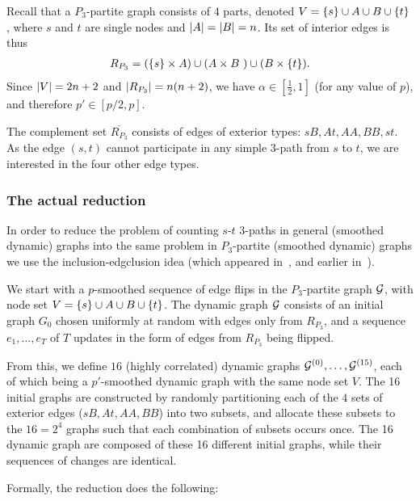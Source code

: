\documentclass[letter,11pt]{article}
\newcommand{\st}{$s$-$t$\xspace}
\begin{document}
Recall that a $P_3$-partite graph consists of $4$ parts, denoted $V = \{s\} \cup A \cup B \cup \{t\}$, where $s$ and $t$ are single nodes and $\card{A} = \card{B} = n$.
Its set of interior edges is thus
\[
\begin{aligned}
    R_{P_3} = \left(\set{s}\times A\right) \cup \left(A\times B\
\right) \cup \left(B\times \set{t}\right) .
\end{aligned}
\]
Since 
$\card{V}=2n+2$ and 
$\card{R_{P_3}} = n(n+2)$,
we have $\alpha\in[\frac{1}{2}, 1]$ (for any value of $p$), and therefore $p' \in [p/2,p]$.

The complement set $\overline{R_{P_3}}$ consists of edges of exterior types: $sB, At, AA, BB, st$. 
As the edge $(s,t)$ cannot participate in any simple $3$-path from $s$ to $t$, we are interested in the four other edge types.

\subsubsection{The actual reduction}
In order to reduce the problem of counting \st 3-paths in general (smoothed dynamic) graphs into the same problem in $P_3$-partite (smoothed dynamic) graphs
we use the inclusion-edgclusion idea (which appeared in~\cite{HLS22}, and earlier in~\cite{DalirrooyfardLW20,Boix-AdseraBB19}).


We start with a $p$-smoothed sequence of edge flips in the $P_3$-partite graph $\mathcal{G}$,
with node set
$V = \{s\} \cup A \cup B \cup \{t\}$.
The dynamic graph $\mathcal{G}$ consists of an initial graph $G_0$ chosen uniformly at random with edges only from $R_{P_3}$, and a sequence $e_1, \dots, e_T$ of $T$ updates in the form of edges from $R_{P_3}$ being flipped.

From this, we define $16$ (highly correlated) dynamic graphs $\mathcal{G}^{(0)}, \dots, \mathcal{G}^{(15)}$, each of which being a $p'$-smoothed dynamic graph with the same node set $V$.
The 16 initial graphs are constructed by randomly partitioning each of the $4$ sets of exterior edges ($sB, At, AA, BB$) into two subsets, and allocate these subsets to the $16=2^4$ graphs such that each combination of subsets occurs once.
The 16 dynamic graph are composed of these 16 different initial graphs, 
while their sequences of changes are identical.

Formally, the reduction does the following:
\end{document}
